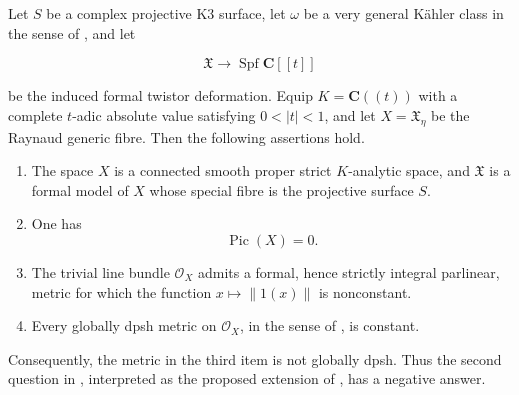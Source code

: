 \begin{proposition}\label{prop:p082-formal-twistor-counterexample}
Let $S$ be a complex projective K3 surface, let $\omega$ be a very
general K\"ahler class in the sense of
\cite[Definition~2.8]{HMS09Orientation}, and let

\[
        \mathfrak X\longrightarrow\operatorname{Spf}\mathbf C[[t]]
\]

be the induced formal twistor deformation.  Equip
$K=\mathbf C((t))$ with a complete $t$-adic absolute value satisfying
$0<|t|<1$, and let $X=\mathfrak X_\eta$ be the Raynaud generic fibre.
Then the following assertions hold.

\begin{enumerate}
\item The space $X$ is a connected smooth proper strict $K$-analytic
space, and $\mathfrak X$ is a formal model of $X$ whose special fibre is
the projective surface $S$.

\item One has
\begin{equation}\label{eq:p082-formal-twistor-picard-zero-candidate}
                         \operatorname{Pic}(X)=0.
\end{equation}

\item The trivial line bundle $\mathcal O_X$ admits a formal, hence
strictly integral parlinear, metric for which the function
$x\mapsto\lVert 1(x)\rVert$ is nonconstant.

\item Every globally dpsh metric on $\mathcal O_X$, in the sense of
\cite[\S17.8.5]{CLD25}, is constant.
\end{enumerate}

Consequently, the metric in the third item is not globally dpsh.  Thus the
second question in \cite[Remark~17.8.10]{CLD25}, interpreted as the proposed
extension of \cite[Corollary~17.8.9]{CLD25}, has a negative answer.
\end{proposition}
